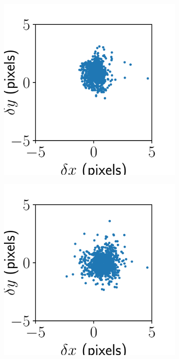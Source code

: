 \documentclass{article}
\begin{document}
\begin{figure}[ht]
\begin{subfigure}{0.24\linewidth}
		\caption{}
		\label{fig:alignmentresultBMS3}
	\end{subfigure}
	\begin{subfigure}{0.24\linewidth}
		\includegraphics[width=\linewidth]{alignment-result-BMS-2.pdf}
		\caption{}
		\label{fig:alignmentresultBMS2}
	\end{subfigure}
	\begin{subfigure}{0.24\linewidth}
		\includegraphics[width=\linewidth]{alignment-result-BMS-1.pdf}

\end{subfigure}
\end{figure}
\end{document}
